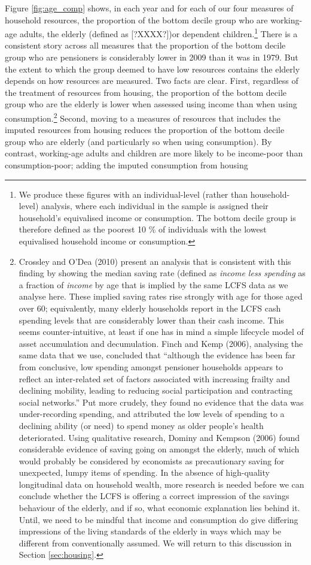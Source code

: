 Figure \ref{fig:age_comp} shows, in each year and for each of our four measures of household resources, the proportion of the bottom decile group who are working-age adults, the elderly (defined as [?XXXX?])or dependent children.\footnote{We produce these figures with an individual-level (rather than household-level) analysis, where each individual in the sample is assigned their household's equivalised income or consumption. The bottom decile group is therefore defined as the poorest 10 \% of individuals with the lowest equivalised household income or consumption.} There is a consistent story across all measures that the proportion of the bottom decile group who are pensioners is considerably lower in 2009 than it was in 1979. But the extent to which the group deemed to have low resources contains the elderly depends on how resources are measured. Two facts are clear. First, regardless of the treatment of resources from housing, the proportion of the bottom decile group who are the elderly is lower when assessed using income than when using consumption.\footnote{Crossley and O'Dea (2010) present an analysis that is consistent with this finding by showing the median saving rate (defined as \emph{income less spending} as a fraction of \emph{income} by age that is implied by the same LCFS data as we analyse here. These implied saving rates rise strongly with age for those aged over 60; equivalently, many elderly households report in the LCFS cash spending levels that are considerably lower than their cash income. This seems counter-intuitive, at least if one has in mind a simple lifecycle model of asset accumulation and decumulation. Finch and Kemp (2006), analysing the same data that we use, concluded that ``although the evidence has been far from conclusive, low spending amongst pensioner households appears to reflect an inter-related set of factors associated with increasing frailty and declining mobility, leading to reducing social participation and contracting social networks.'' Put more crudely, they found no evidence that the data was under-recording spending, and attributed the low levels of spending to a declining ability (or need) to spend money as older people's health deteriorated. Using qualitative research, Dominy and Kempson (2006) found considerable evidence of saving going on amongst the elderly, much of which would probably be considered by economists as precautionary saving for unexpected, lumpy items of spending. In the absence of high-quality longitudinal data on household wealth, more research is needed before we can conclude whether the LCFS is offering a correct impression of the savings behaviour of the elderly, and if so, what economic explanation lies behind it. Until, we need to be mindful that income and consumption do give differing impressions of the living standards of the elderly in ways which may be different from conventionally assumed. We will return to this discussion in Section \ref{sec:housing}.} Second, moving to a measures of resources that includes the imputed resources from housing reduces the proportion of the bottom decile group who are elderly (and particularly so when using consumption). By contrast, working-age adults and children are more likely to be income-poor than consumption-poor; adding the imputed consumption from housing 